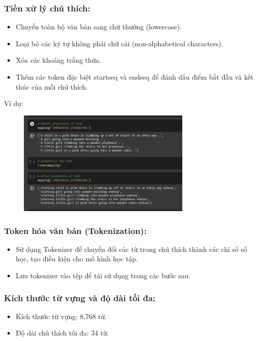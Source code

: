 \documentclass{article}
\begin{document}
\subsubsection{Tiền xử lý chú thích:}
\begin{itemize}
    \item Chuyển toàn bộ văn bản sang chữ thường (lowercase).
    \item Loại bỏ các ký tự không phải chữ cái (non-alphabetical characters).
    \item Xóa các khoảng trắng thừa.
    \item Thêm các token đặc biệt startseq và endseq để đánh dấu điểm bắt đầu và kết thúc của mỗi chú thích.
\end{itemize}
Ví dụ:
\begin{figure}[h]
  \centering
  \includegraphics[width=0.75\textwidth]{img/anh4.png}
  \label{fig:my_label}
\end{figure}
\subsubsection{Token hóa văn bản (Tokenization):}
\begin{itemize}
    \item Sử dụng Tokenizer để chuyển đổi các từ trong chú thích thành các chỉ số số học, tạo điều kiện cho mô hình học tập.
    \item Lưu tokenizer vào tệp để tái sử dụng trong các bước sau.
\end{itemize}
\subsubsection{Kích thước từ vựng và độ dài tối đa:}
\begin{itemize}
    \item Kích thước từ vựng: 8,768 từ.
    \item Độ dài chú thích tối đa: 34 từ.
\end{itemize}
\end{document}
